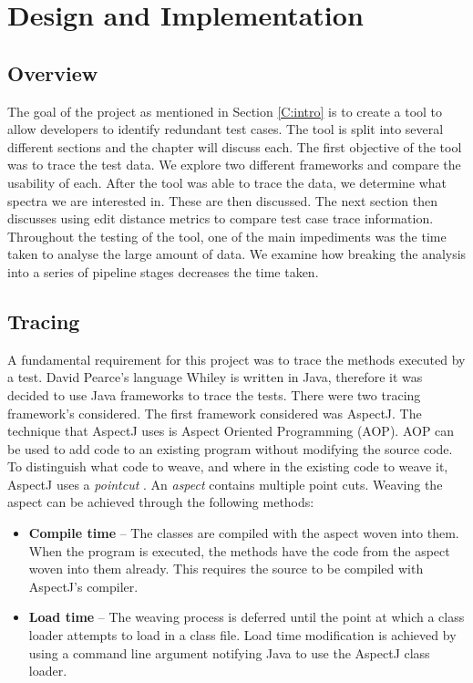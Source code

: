 \chapter{Design and Implementation}\label{C:workdone}

\section{Overview}

The goal of the project as mentioned in Section \ref{C:intro} is to create a tool to allow developers to identify redundant test cases. The tool is split into several different sections and the chapter will discuss each. The first objective of the tool was to trace the test data. We explore two different frameworks and compare the usability of each. After the tool was able to trace the data, we determine what spectra we are interested in. These are then discussed. The next section then discusses using edit distance metrics to compare test case trace information. Throughout the testing of the tool, one of the main impediments was the time taken to analyse the large amount of data. We examine how breaking the analysis into a series of pipeline stages decreases the time taken.

\section{Tracing}
\label{S:trace}
A fundamental requirement for this project was to trace the methods executed by a test. David Pearce's language Whiley is written in Java, therefore it was decided to use Java frameworks to trace the tests. There were two tracing framework's considered. The first framework considered was AspectJ. The technique that AspectJ uses is Aspect Oriented Programming (AOP). AOP can be used to add code to an existing program without modifying the source code. To distinguish what code to weave, and where in the existing code to weave it, AspectJ uses a \textit{pointcut} \cite{aspectj}. An \textit{aspect} contains multiple point cuts. Weaving the aspect can be achieved through the following methods:

\begin{itemize}
\item \textbf{Compile time} --
The classes are compiled with the aspect woven into them. When the program is executed, the methods have the code from the aspect woven into them already. This requires the source to be compiled with AspectJ's compiler.
\item \textbf{Load time} --
The weaving process is deferred until the point at which a class loader attempts to load in a class file. Load time modification is achieved by using a command line argument notifying Java to use the AspectJ class loader.
\end{itemize}

